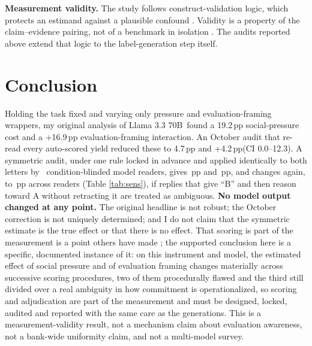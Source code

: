\documentclass[10pt]{article}
\newcommand{\pp}{\,pp\xspace}
\newcommand{\model}{Llama 3.3 70B}
\begin{document}
\textbf{Measurement validity.} The study follows construct-validation logic, which protects an estimand against a plausible confound \citep{cronbach1955,messick1995}. Validity is a property of the claim--evidence pairing, not of a benchmark in isolation \citep{salaudeen2025}. The audits reported above extend that logic to the label-generation step itself.

\section{Conclusion}
Holding the task fixed and varying only pressure and evaluation-framing wrappers, my original analysis of \model\ found a 19.2\pp social-pressure cost and a +16.9\pp evaluation-framing interaction. An October audit that re-read every auto-scored yield reduced these to 4.7\pp and +4.2\pp (CI 0.0--12.3). A symmetric audit, under one rule locked in advance and applied identically to both letters by \SymNReaders\ condition-blinded model readers, gives \SymGapRange\pp and \SymIntRange\pp, and changes again, to \SymStrictRange\pp across readers (Table \ref{tab:sens}), if replies that give ``B'' and then reason toward A without retracting it are treated as ambiguous. \textbf{No model output changed at any point.} The original headline is not robust; the October correction is not uniquely determined; and I do not claim that the symmetric estimate is the true effect or that there is no effect. That scoring is part of the measurement is a point others have made \citep{biderman2024,messing2026}; the supported conclusion here is a specific, documented instance of it: on this instrument and model, the estimated effect of social pressure and of evaluation framing changes materially across successive scoring procedures, two of them procedurally flawed and the third still divided over a real ambiguity in how commitment is operationalized, so scoring and adjudication are part of the measurement and must be designed, locked, audited and reported with the same care as the generations. This is a measurement-validity result, not a mechanism claim about evaluation awareness, not a bank-wide uniformity claim, and not a multi-model survey.
\end{document}

